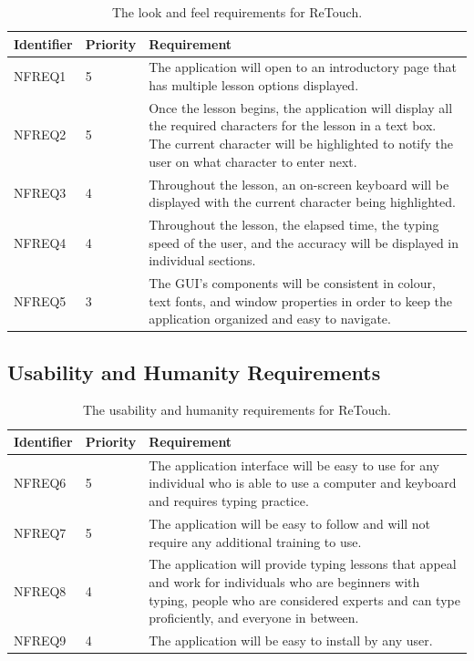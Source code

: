 \documentclass[12pt, titlepage]{article}
\begin{document}
\begin{table}[H]
  \caption{The look and feel requirements for ReTouch.}
\begin{tabular}{ |m{2cm}|m{1.8cm}|m{9.4cm}| }
    \hline
    \textbf{Identifier} & \textbf{Priority} & \textbf{Requirement} \\ 
    \hline
    NFREQ1 & 5 & The application will open to an introductory page that has multiple lesson options displayed. \\ 
    \hline
    NFREQ2 & 5 & Once the lesson begins, the application will display all the required characters for the lesson in a text box. The current character will be highlighted to notify the user on what character to enter next. \\ 
    \hline
    NFREQ3 & 4 & Throughout the lesson, an on-screen keyboard will be displayed with the current character being highlighted. \\ 
    \hline
    NFREQ4 & 4 & Throughout the lesson, the elapsed time, the typing speed of the user, and the accuracy will be displayed in individual sections. \\ 
    \hline
    NFREQ5 & 3 & The GUI's components will be consistent in colour, text fonts, and window properties in order to keep the application organized and easy to navigate. \\ 
    \hline
\end{tabular}
\end{table}

\subsection{Usability and Humanity Requirements}

\begin{table}[H]
  \caption{The usability and humanity requirements for ReTouch.}
\begin{tabular}{ |m{2cm}|m{1.8cm}|m{9.4cm}| }
    \hline
    \textbf{Identifier} & \textbf{Priority} & \textbf{Requirement} \\ 
    \hline
    NFREQ6 & 5 & The application interface will be easy to use for any individual who is able to use a computer and keyboard and requires typing practice. \\
    \hline
    NFREQ7 & 5 & The application will be easy to follow and will not require any additional training to use. \\ 
    \hline
    NFREQ8 & 4 & The application will provide typing lessons that appeal and work for individuals who are beginners with typing, people who are considered experts and can type proficiently, and everyone in between. \\
    \hline
    NFREQ9 & 4 & The application will be easy to install by any user. \\
    \hline
\end{tabular}
\end{table}
\end{document}
